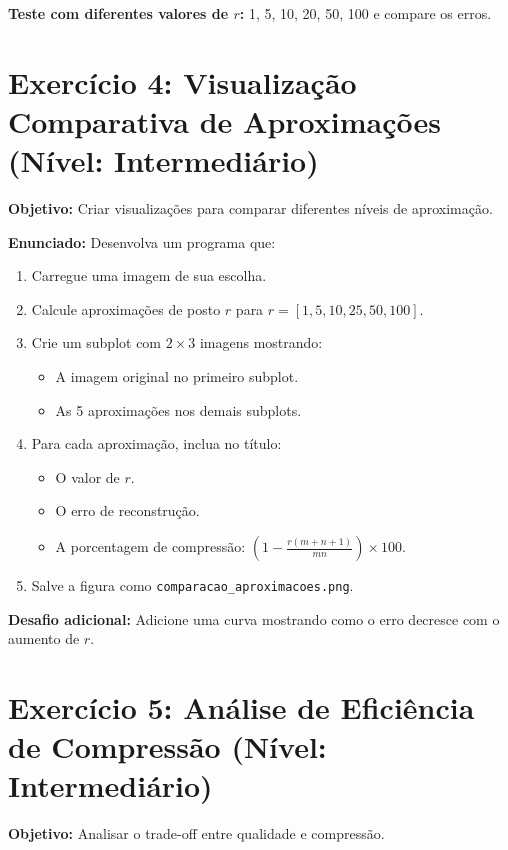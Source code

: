 \documentclass[a4paper,12pt]{article}
\begin{document}
\textbf{Teste com diferentes valores de $r$:} 1, 5, 10, 20, 50, 100 e compare os erros.

\section*{Exercício 4: Visualização Comparativa de Aproximações (Nível: Intermediário)}

\textbf{Objetivo:} Criar visualizações para comparar diferentes níveis de aproximação.

\textbf{Enunciado:}
Desenvolva um programa que:
\begin{enumerate}
    \item Carregue uma imagem de sua escolha.
    \item Calcule aproximações de posto $r$ para $r = [1, 5, 10, 25, 50, 100]$.
    \item Crie um subplot com $2 \times 3$ imagens mostrando:
    \begin{itemize}
        \item A imagem original no primeiro subplot.
        \item As 5 aproximações nos demais subplots.
    \end{itemize}
    \item Para cada aproximação, inclua no título:
    \begin{itemize}
        \item O valor de $r$.
        \item O erro de reconstrução.
        \item A porcentagem de compressão: $\left(1 - \frac{r(m+n+1)}{mn}\right) \times 100$.
    \end{itemize}
    \item Salve a figura como \texttt{comparacao\_aproximacoes.png}.
\end{enumerate}

\textbf{Desafio adicional:} Adicione uma curva mostrando como o erro decresce com o aumento de $r$.

\section*{Exercício 5: Análise de Eficiência de Compressão (Nível: Intermediário)}

\textbf{Objetivo:} Analisar o trade-off entre qualidade e compressão.
\end{document}
